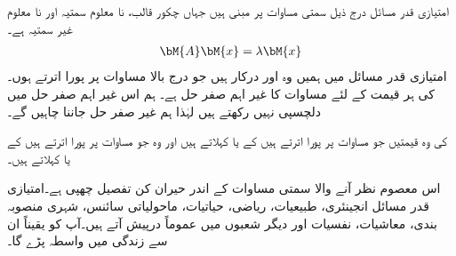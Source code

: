 امتیازی قدر مسائل درج ذیل سمتی مساوات پر مبنی ہیں جہاں  چکور قالب،  نا معلوم سمتیہ اور  نا معلوم غیر سمتیہ ہے۔
\begin{align}\label{مساوات_امتیازی_مسئلہ_الف}
\bM{A}\bM{x}=\lambda \bM{x}
\end{align}
امتیازی قدر مسائل میں ہمیں وہ  اور  درکار ہیں جو درج بالا مساوات پر پورا اترتے ہوں۔  کی ہر قیمت کے لئے 
  مساوات  کا غیر اہم صفر حل ہے۔ ہم اس غیر اہم صفر حل میں دلچسپی نہیں رکھتے ہیں لہٰذا ہم غیر صفر حل  جاننا چاہیں گے۔

 کی وہ قیمتیں جو مساوات  پر پورا اترتے ہیں  کے  یا  کہلاتے ہیں اور وہ  جو مساوات  پر پورا اترتے ہیں  کے  یا  کہلاتے ہیں۔

اس معصوم نظر آنے والا سمتی مساوات کے اندر حیران کن تفصیل چھپی ہے۔امتیازی قدر مسائل انجینئری، طبیعیات، ریاضی، حیاتیات، ماحولیاتی سائنس، شہری منصوبہ بندی،  معاشیات، نفسیات اور دیگر شعبوں میں عموماً درپیش آتے ہیں۔آپ کو یقیناً ان سے زندگی میں واسطہ پڑے گا۔

